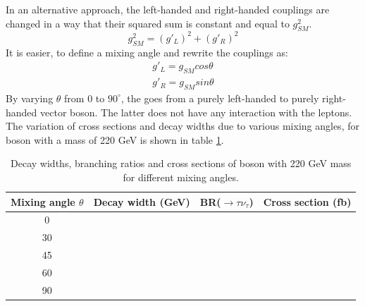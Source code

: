 In an alternative approach, the left-handed and right-handed couplings are changed in a way that their squared sum is constant and equal to $g_{SM}^2$.
\begin{equation}
g_{SM}^2 = (g'_L)^2 +  (g'_R)^2 
\end{equation}
It is easier, to define a mixing angle and rewrite the couplings as:
\begin{eqnarray}
g'_L  = g_{SM} cos\theta \\
g'_R  = g_{SM} sin\theta
\end{eqnarray}
By varying $\theta$ from 0 to $ 90^\circ $, the \wprime goes from a purely left-handed to purely right-handed vector boson. The latter \wprime does not have any interaction with the leptons. 
The variation of cross sections and decay widths due to various mixing angles, for \wprime boson with a mass of 220 GeV is shown in table \ref{tab:mixingAngle}.
\begin{table}[htb]
	\centering
	\begin{tabular}{|c|c|c|c|}
		\hline 
		Mixing angle $\theta$  &  Decay width (GeV) & BR(\wprime $\rightarrow \tau \nu_\tau$)  &  Cross section (fb)\\
		\hline 
		0      &          &          & \\
		30      &          &          & \\
		45      &          &          & \\
		60      &          &          & \\
		90      &          &          & \\
		\hline
	\end{tabular}
	\caption{Decay widths, branching ratios and cross sections  of \wprime boson with 220 GeV mass for different mixing angles. \label{tab:mixingAngle} }
\end{table}

